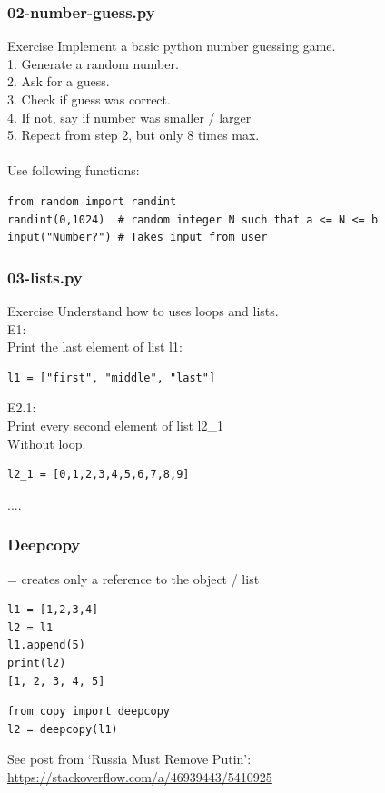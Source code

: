 \documentclass{beamer}
\begin{document}
\begin{frame}[fragile]
	\frametitle{02-number-guess.py}
	\begin{exampleblock}{Exercise}
Implement a basic python number guessing game.\\
1. Generate a random number.\\
2. Ask for a guess.\\
3. Check if guess was correct.\\
4. If not, say if number was smaller / larger\\
5. Repeat from step 2, but only 8 times max.\\
~\\
Use following functions:
		\begin{verbatim}
from random import randint
randint(0,1024)  # random integer N such that a <= N <= b
input("Number?") # Takes input from user
		\end{verbatim}
	\end{exampleblock}
\end{frame}


\begin{frame}[fragile]
	\frametitle{03-lists.py}
	\begin{exampleblock}{Exercise}
		Understand how to uses loops and lists.\\
E1:\\
Print the last element of list l1:
\begin{verbatim}
l1 = ["first", "middle", "last"]
\end{verbatim}
E2.1:\\
Print every second element of list l2\_1\\
Without loop.
\begin{verbatim}
l2_1 = [0,1,2,3,4,5,6,7,8,9]
\end{verbatim}
....
	\end{exampleblock}
\end{frame}

\begin{frame}[fragile]
	\frametitle{Deepcopy}
= creates only a reference to the object / list	
		\begin{example}
			\begin{verbatim}
l1 = [1,2,3,4]
l2 = l1
l1.append(5)
print(l2)
[1, 2, 3, 4, 5]
			\end{verbatim}
		\end{example}

\begin{block}{}
\begin{verbatim}
from copy import deepcopy
l2 = deepcopy(l1)
\end{verbatim}
\end{block}	
See post from `Russia Must Remove Putin': \url{https://stackoverflow.com/a/46939443/5410925}	

\end{frame}
\end{document}
